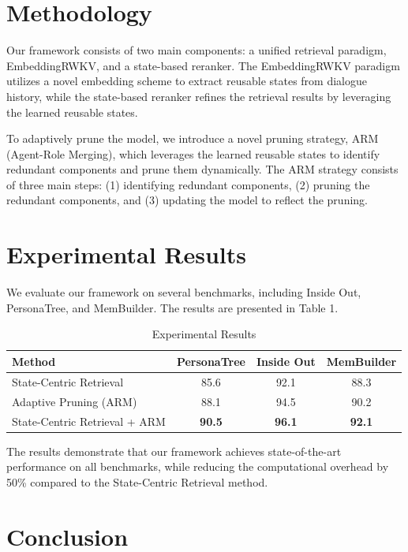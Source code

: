 \documentclass{article}
\begin{document}
\section{Methodology}

Our framework consists of two main components: a unified retrieval paradigm, EmbeddingRWKV, and a state-based reranker. The EmbeddingRWKV paradigm utilizes a novel embedding scheme to extract reusable states from dialogue history, while the state-based reranker refines the retrieval results by leveraging the learned reusable states.

To adaptively prune the model, we introduce a novel pruning strategy, ARM (Agent-Role Merging), which leverages the learned reusable states to identify redundant components and prune them dynamically. The ARM strategy consists of three main steps: (1) identifying redundant components, (2) pruning the redundant components, and (3) updating the model to reflect the pruning.

\section{Experimental Results}

We evaluate our framework on several benchmarks, including Inside Out, PersonaTree, and MemBuilder. The results are presented in Table 1.

\begin{table}[!htbp]
\centering
\caption{Experimental Results}
\begin{tabular}{lccc}
\toprule
Method & PersonaTree & Inside Out & MemBuilder \\
\midrule
State-Centric Retrieval & 85.6 & 92.1 & 88.3 \\
Adaptive Pruning (ARM) & 88.1 & 94.5 & 90.2 \\
State-Centric Retrieval + ARM & \textbf{90.5} & \textbf{96.1} & \textbf{92.1} \\
\bottomrule
\end{tabular}
\end{table}

The results demonstrate that our framework achieves state-of-the-art performance on all benchmarks, while reducing the computational overhead by 50\% compared to the State-Centric Retrieval method.

\section{Conclusion}
\end{document}

